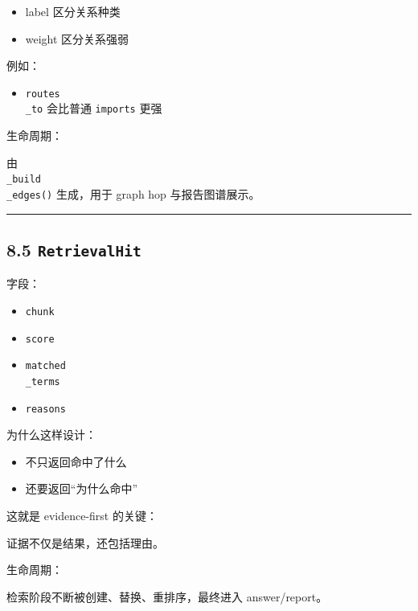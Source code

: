 \documentclass[UTF8,12pt,openany]{ctexbook}
\begin{document}
\begin{itemize}
\item label 区分关系种类
\item weight 区分关系强弱
\end{itemize}

例如：\par

\begin{itemize}
\item \texttt{routes\\_to} 会比普通 \texttt{imports} 更强
\end{itemize}

生命周期：\par

由 \texttt{\\_build\\_edges()} 生成，用于 graph hop 与报告图谱展示。\par

\hrule

\subsection{8.5 \texttt{RetrievalHit}}

字段：\par

\begin{itemize}
\item \texttt{chunk}
\item \texttt{score}
\item \texttt{matched\\_terms}
\item \texttt{reasons}
\end{itemize}

为什么这样设计：\par

\begin{itemize}
\item 不只返回命中了什么
\item 还要返回“为什么命中”
\end{itemize}

这就是 evidence-first 的关键：  \par
证据不仅是结果，还包括理由。\par

生命周期：\par

检索阶段不断被创建、替换、重排序，最终进入 answer/report。\par
\end{document}
